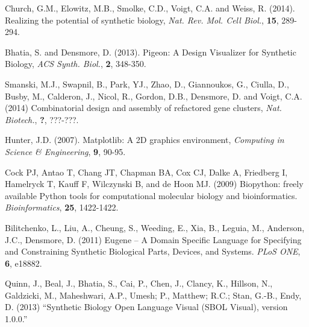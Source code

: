 \documentclass{bioinfo}
\begin{document}
\begin{thebibliography}{}
 Church, G.M., Elowitz, M.B., Smolke, C.D., Voigt, C.A. and Weiss, R. (2014). Realizing the potential of synthetic biology, {\it Nat. Rev. Mol. Cell Biol.}, {\bf 15}, 289-294.

 Bhatia, S. and Densmore, D. (2013). Pigeon: A Design Visualizer for Synthetic Biology, {\it ACS Synth. Biol.}, {\bf 2}, 348-350.

 Smanski, M.J., Swapnil, B., Park, YJ., Zhao, D., Giannoukos, G., Ciulla, D., Busby, M., Calderon, J., Nicol, R., Gordon, D.B., Densmore, D. and Voigt, C.A. (2014) Combinatorial design and assembly of refactored gene clusters, {\it Nat. Biotech.}, {\bf ?}, ???-???.

 Hunter, J.D. (2007). Matplotlib: A 2D graphics environment, {\it Computing in Science \& Engineering}, {\bf 9}, 90-95.

Cock PJ, Antao T, Chang JT, Chapman BA, Cox CJ, Dalke A, Friedberg I, Hamelryck T, Kauff F, Wilczynski B, and de Hoon MJ. (2009) Biopython: freely available Python tools for computational molecular biology and bioinformatics. {\it Bioinformatics}, {\bf 25}, 1422-1422.

Bilitchenko, L., Liu, A., Cheung, S., Weeding, E., Xia, B., Leguia, M., Anderson, J.C., Densmore, D. (2011) Eugene – A Domain Specific Language for Specifying and Constraining Synthetic Biological Parts, Devices, and Systems. {\it PLoS ONE}, {\bf 6}, e18882.

Quinn, J., Beal, J., Bhatia, S., Cai, P., Chen, J., Clancy, K., Hillson, N., Galdzicki, M., Maheshwari, A.P., Umesh; P., Matthew; R.C.; Stan, G.-B., Endy, D. (2013) ``Synthetic Biology Open Language Visual (SBOL Visual), version 1.0.0.''

\end{thebibliography}
\end{document}
